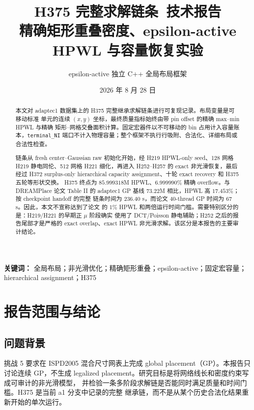\documentclass[UTF8,a4paper,11pt]{ctexrep}
\title{H375 完整求解链条\ 技术报告\\
\large 精确矩形重叠密度、epsilon-active HPWL 与容量恢复实验}
\author{epsilon-active 独立 C++ 全局布局框架}
\date{2026 年 8 月 28 日}
\begin{document}
\maketitle
\thispagestyle{empty}

\begin{abstract}
本文对 adaptec1 数据集上的 H375 完整继承求解链条进行可复现记录。布局变量是可移动标准
单元的连续 $(x,y)$ 坐标，最终质量指标始终由带 pin offset 的精确 max--min HPWL 与精确
矩形--网格交叠面积计算。固定宏器件以不可移动的 bin 占用计入容量账本，\texttt{terminal\_NI}
端口不计入物理容量；整个框架不执行行吸附、合法化、详细布局或合法性检查。

链条从 fresh center--Gaussian raw 初始化开始，经 H219 HPWL-only seed、128 网格 H219
静电同伦、512 网格 H221 细化，再进入 H252--H257 的 exact 非光滑恢复，最后经过 H372
surplus-only hierarchical capacity assignment、十轮 exact recovery 和 H375 五轮等形状交换。
H375 终点为 $85.999318$M HPWL、$6.999990\%$ 精确 overflow。与 DREAMPlace 论文 Table II
的 adaptec1 GP 基线 $73.22$M 相比，HPWL 高 $17.453\%$；按 checkpoint handoff 的完整
链条时间为 $236.40$ s，而论文 40-thread GP 时间为 $67$ s。因此，本文不宣称达到了论文
的 1\% HPWL 和两倍运行时间门槛。需要特别区分的是：H219/H221 的早期正 $\mu$ 阶段确实
使用了 DCT/Poisson 静电辅助；H252 之后的报告尾部才是严格的 exact overlap、exact HPWL
非光滑求解。该区分是本报告的主要审计结论。
\end{abstract}

\noindent\textbf{关键词：} 全局布局；非光滑优化；精确矩形重叠；epsilon-active；固定宏容量；
hierarchical assignment；H375

\tableofcontents
\listoffigures

\chapter{报告范围与结论}

\section{问题背景}
挑战 5 要求在 ISPD2005 混合尺寸网表上完成 global placement（GP）。本报告只讨论连续
GP，不生成 legalized placement。研究目标是将网络线长和密度约束写成可审计的非光滑模型，
并检验一条多阶段求解链是否能同时满足质量和时间门槛。H375 是当前 a1 分支中记录的完整
继承链，而不是从某个历史合法化结果重新开始的单次运行。
\end{document}
